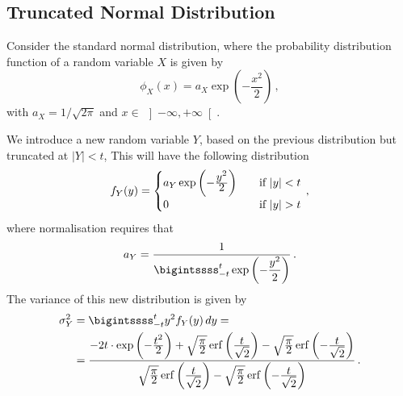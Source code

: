 \documentclass[../../main.tex]{subfiles}
\begin{document}
\begin{appendices}
\chapter{Truncated Normal Distribution}\label{app: Dist Trunc}   
    Consider the standard normal distribution, where the probability distribution function of a random variable $X$ is given by
        \begin{equation}\label{eq: Truncated Distribution - pdf Normal}
            \phi_X(x) = a_X\exp \left( -\frac{x^2}{2} \right) \,,
        \end{equation}
    with $a_X = 1/\sqrt{2\pi}$ and $x\in\, \left] -\infty, +\infty \right[$. 
    
    We introduce a new random variable $Y$, based on the previous distribution but truncated at $\left|Y\right| < t $, This will have the following distribution
        \begin{equation}\label{eq: Truncated Distribution - pdf trunc without correction}
            f_Y(y) =
            \begin{cases}
                a_Y\exp \left( -\frac{\displaystyle y^2}{\displaystyle 2} \right) \quad &\text{if}\, \left| y \right| < t \\
                0 \quad &\text{if}\, \left| y \right| > t 
            \end{cases}
            \,,
        \end{equation}
    where normalisation requires that
        \begin{equation}\label{eq: Truncated Distribution - a_Y}
            a_Y = \ddfrac{1}{ \bigintssss_{-t}^t\exp \left( -\frac{y^2}{2} \right)} \,.
        \end{equation}
    The variance of this new distribution is given by
        \begin{equation}\label{eq: Truncated Distribution - var_Y}
        \begin{split}
            \sigma_Y^2 &= \bigintssss_{-t}^{t} y^2f_Y(y)\,dy = \\
            &= \frac{-2t \cdot \exp\left( -\ddfrac{t^2}{2} \right) + \sqrt{\ddfrac{\pi}{2}} \erf\left( \ddfrac{t}{\sqrt{2}} \right) - \sqrt{\ddfrac{\pi}{2}} \erf\left( -\ddfrac{t}{\sqrt{2}} \right)}{\sqrt{\ddfrac{\pi}{2}} \erf\left( \ddfrac{t}{\sqrt{2}} \right) - \sqrt{\ddfrac{\pi}{2}} \erf\left( -\ddfrac{t}{\sqrt{2}} \right)} \,.
        \end{split}
        \end{equation}
        

\end{appendices}
\end{document}

